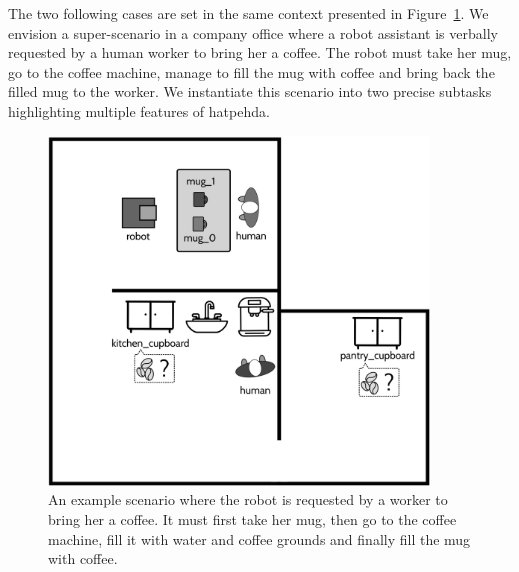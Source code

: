 \documentclass[a4paper,11pt,twoside]{StyleThese}
\begin{document}
The two following cases are set in the same context presented in Figure~\ref{fig:chap4coffeescene}. We envision a super-scenario in a company office where a robot assistant is verbally requested by a human worker to bring her a coffee. The robot must take her mug, go to the coffee machine, manage to fill the mug with coffee and bring back the filled mug to the worker.
We instantiate this scenario into two precise subtasks highlighting multiple features of \acrshort{hatpehda}.

\begin{figure}[hbtp]
\centering
\includegraphics[width=0.9\textwidth]{figures/chapter4/Chap4CoffeeScene.png}
\caption{An example scenario where the robot is requested by a worker to bring her a coffee. It must first take her mug, then go to the coffee machine, fill it with water and coffee grounds and finally fill the mug with coffee.}
\label{fig:chap4coffeescene}
\end{figure}
\end{document}
